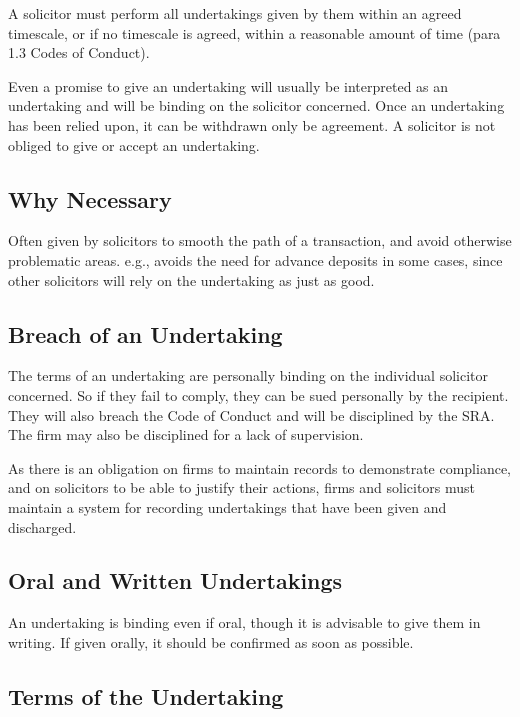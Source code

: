 \documentclass[
]{article}
\begin{document}
A solicitor must perform all undertakings given by them within an agreed
timescale, or if no timescale is agreed, within a reasonable amount of
time (para 1.3 Codes of Conduct).

Even a promise to give an undertaking will usually be interpreted as an
undertaking and will be binding on the solicitor concerned. Once an
undertaking has been relied upon, it can be withdrawn only be agreement.
A solicitor is not obliged to give or accept an undertaking.

\hypertarget{why-necessary}{%
\subsection{Why Necessary}\label{why-necessary}}

Often given by solicitors to smooth the path of a transaction, and avoid
otherwise problematic areas. e.g., avoids the need for advance deposits
in some cases, since other solicitors will rely on the undertaking as
just as good.

\hypertarget{breach-of-an-undertaking}{%
\subsection{Breach of an Undertaking}\label{breach-of-an-undertaking}}

The terms of an undertaking are personally binding on the individual
solicitor concerned. So if they fail to comply, they can be sued
personally by the recipient. They will also breach the Code of Conduct
and will be disciplined by the SRA. The firm may also be disciplined for
a lack of supervision.

As there is an obligation on firms to maintain records to demonstrate
compliance, and on solicitors to be able to justify their actions, firms
and solicitors must maintain a system for recording undertakings that
have been given and discharged.

\hypertarget{oral-and-written-undertakings}{%
\subsection{Oral and Written
Undertakings}\label{oral-and-written-undertakings}}

An undertaking is binding even if oral, though it is advisable to give
them in writing. If given orally, it should be confirmed as soon as
possible.

\hypertarget{terms-of-the-undertaking}{%
\subsection{Terms of the Undertaking}\label{terms-of-the-undertaking}}
\end{document}
